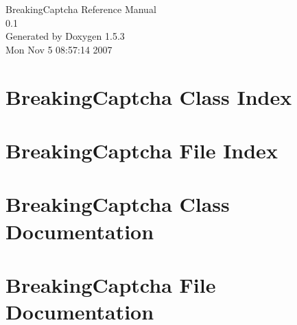 \documentclass[a4paper]{book}
\begin{document}
\begin{titlepage}
\vspace*{7cm}
\begin{center}
{\Large BreakingCaptcha Reference Manual\\[1ex]\large 0.1 }\\
\vspace*{1cm}
{\large Generated by Doxygen 1.5.3}\\
\vspace*{0.5cm}
{\small Mon Nov 5 08:57:14 2007}\\
\end{center}
\end{titlepage}
\clearemptydoublepage
{}
\tableofcontents
\clearemptydoublepage
{}
\chapter{BreakingCaptcha Class Index}

\chapter{BreakingCaptcha File Index}

\chapter{BreakingCaptcha Class Documentation}



\chapter{BreakingCaptcha File Documentation}






\printindex
\end{document}

